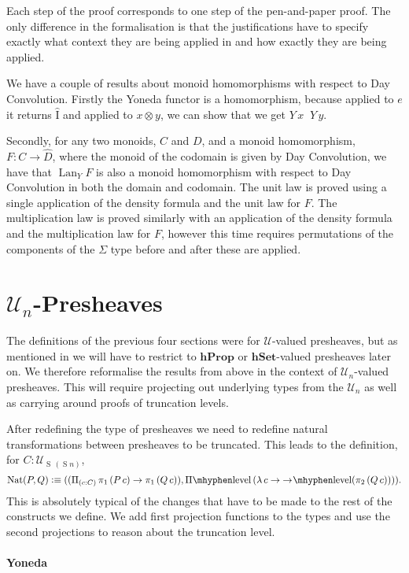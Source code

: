 \documentclass[12pt, parskip, DIV=14]{scrbook}
\newcommand{\defeq}{\vcentcolon\equiv}
\newcommand{\Nat}{\operatorname{Nat}}
\newcommand{\Suc}{\operatorname{S}}
\newcommand{\hProp}{\mathbf{hProp}}
\newcommand{\hSet}{\mathbf{hSet}}
\DeclareMathOperator\daytensor{\widehat\otimes}
\newcommand{\dayid}{\operatorname{\hat{I}}}
\newcommand{\Lan}{\operatorname{Lan}}
\begin{document}
Each step of the proof corresponds to one step of the pen-and-paper proof. The only difference in the formalisation is that the justifications have to specify exactly what context they are being applied in and how exactly they are being applied.

We have a couple of results about monoid homomorphisms with respect to Day Convolution. Firstly the Yoneda functor is a homomorphism, because applied to $e$ it returns $\dayid$ and applied to $x \otimes y$, we can show that we get $Y\,x \daytensor Y\,y$.

Secondly, for any two monoids, $C$ and $D$, and a monoid homomorphism, $F : C \to \widehat{D}$, where the monoid of the codomain is given by Day Convolution, we have that $\Lan_Y F$ is also a monoid homomorphism with respect to Day Convolution in both the domain and codomain. The unit law is proved using a single application of the density formula and the unit law for $F$. The multiplication law is proved similarly with an application of the density formula and the multiplication law for $F$, however this time requires permutations of the components of the $\Sigma$ type before and after these are applied.

\section{$\mathcal{U}_n$-Presheaves}

The definitions of the previous four sections were for $\mathcal{U}$-valued presheaves, but as mentioned in  we will have to restrict to $\hProp$ or $\hSet$-valued presheaves later on. We therefore reformalise the results from above in the context of $\mathcal{U}_n$-valued presheaves. This will require projecting out underlying types from the $\mathcal{U}_n$ as well as carrying around proofs of truncation levels.

After redefining the type of presheaves we need to redefine natural transformations between presheaves to be truncated. This leads to the definition, for $C : \mathcal{U}_{\Suc\,(\Suc n)}$,
$$\Nat(P,Q) \defeq ((\Pi_{(c : C)}\,\pi_1\,(P\,c) \to \pi_1\,(Q\,c)) , \mathrm{\Pi\mhyphen level}\,(\lambda\,c \to \mathrm{\to\mkern-4mu\mhyphen level} (\pi_2\,(Q\,c)))).$$
This is absolutely typical of the changes that have to be made to the rest of the constructs we define. We add first projection functions to the types and use the second projections to reason about the truncation level.

\paragraph{Yoneda}
\end{document}
